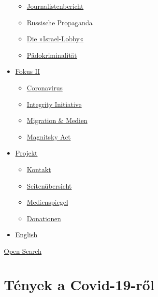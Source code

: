 \begin{itemize}
  \begin{itemize}
  \tightlist
  \item
    \href{https://swprs.org/bericht-eines-journalisten/}{Journalistenbericht}
  \item
    \href{https://swprs.org/russische-propaganda/}{Russische Propaganda}
  \item
    \href{https://swprs.org/die-israel-lobby-fakten-und-mythen/}{Die
    »Israel-Lobby«}
  \item
    \href{https://swprs.org/geopolitik-und-paedokriminalitaet/}{Pädokriminalität}
  \end{itemize}
\item
  \href{https://swprs.org/migration-und-medien/}{Fokus II}

  \begin{itemize}
  \tightlist
  \item
    \href{https://swprs.org/covid-19-hinweis-ii/}{Coronavirus}
  \item
    \href{https://swprs.org/die-integrity-initiative/}{Integrity
    Initiative}
  \item
    \href{https://swprs.org/migration-und-medien/}{Migration \& Medien}
  \item
    \href{https://swprs.org/der-fall-magnitsky/}{Magnitsky Act}
  \end{itemize}
\item
  \href{https://swprs.org/kontakt/}{Projekt}

  \begin{itemize}
  \tightlist
  \item
    \href{https://swprs.org/kontakt/}{Kontakt}
  \item
    \href{https://swprs.org/uebersicht/}{Seitenübersicht}
  \item
    \href{https://swprs.org/medienspiegel/}{Medienspiegel}
  \item
    \href{https://swprs.org/donationen/}{Donationen}
  \end{itemize}
\item
  \href{https://swprs.org/contact/}{English}
\end{itemize}

\protect\hyperlink{}{Open Search}

\hypertarget{tuxe9nyek-a-covid-19-rux151l}{%
\section{Tények a Covid-19-ről}\label{tuxe9nyek-a-covid-19-rux151l}}

